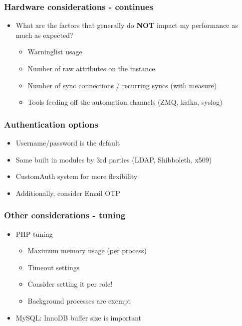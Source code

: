 \begin{frame}
\frametitle{Hardware considerations - continues}
    \begin{itemize}
        \item What are the factors that generally do {\bf NOT} impact my performance as much as expected?
        \begin{itemize}
            \item Warninglist usage
            \item Number of raw attributes on the instance
            \item Number of sync connections / recurring syncs (with measure)
            \item Tools feeding off the automation channels (ZMQ, kafka, syslog)
        \end{itemize}
    \end{itemize}
\end{frame}

\begin{frame}
\frametitle{Authentication options}
    \begin{itemize}
        \item Username/password is the default
        \item Some built in modules by 3rd parties (LDAP, Shibboleth, x509)
        \item CustomAuth system for more flexibility
        \item Additionally, consider Email OTP
    \end{itemize}
\end{frame}

\begin{frame}
\frametitle{Other considerations - tuning}
    \begin{itemize}
        \item PHP tuning
        \begin{itemize}
            \item Maximum memory usage (per process)
            \item Timeout settings
            \item Consider setting it per role!
            \item Background processes are exempt
        \end{itemize}
        \item MySQL: InnoDB buffer size is important
    \end{itemize}
\end{frame}

